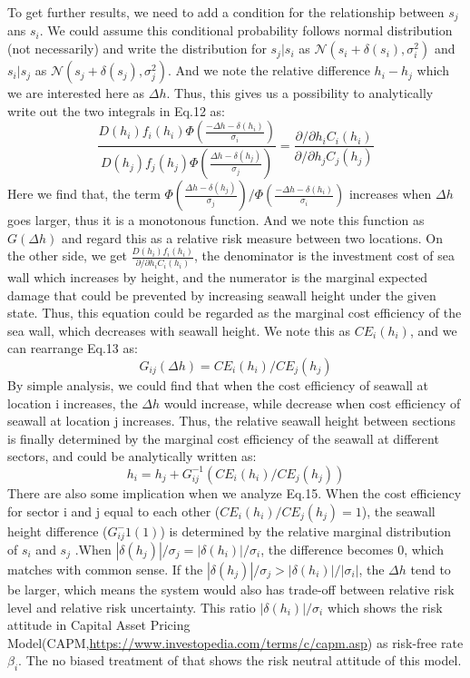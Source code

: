 \documentclass{article}
\begin{document}
To get further results, we need to add a condition for the relationship between $s_j$ ans $s_i$. We could assume this conditional probability follows normal distribution (not necessarily) and write the distribution for $s_j|s_i$ as $\mathcal{N}(s_i+\delta(s_i),\sigma_i^2)$ and $s_i|s_j$ as $\mathcal{N}(s_j+\delta(s_j),\sigma_j^2)$. And we note the relative difference $h_i-h_j$ which we are interested here as $\Delta h$. Thus, this gives us a possibility to analytically write out the two integrals in Eq.12 as:
\begin{equation}
    \frac{D(h_i)f_i(h_i)\Phi(\frac{-\Delta h-\delta(h_i)}{\sigma_i})}{D(h_j)f_j(h_j)\Phi(\frac{\Delta h-\delta(h_j)}{\sigma_j})} = \frac{{\partial}/{\partial h_i}C_i(h_i)}{{\partial}/{\partial h_j}C_j(h_j)}
\end{equation}
Here we find that, the term $\Phi(\frac{\Delta h-\delta(h_j)}{\sigma_j})/\Phi(\frac{-\Delta h-\delta(h_i)}{\sigma_i})$ increases when $\Delta h$ goes larger, thus it is a monotonous function. And we note this function as $G(\Delta h)$ and regard this as a relative risk measure between two locations.  On the other side, we get $\frac{D(h_i)f_i(h_i)}{\partial/ \partial h_i C_i(h_i)}$, the denominator is the investment cost of sea wall which increases by height, and the numerator is the marginal expected damage that could be prevented by increasing seawall height under the given state. Thus, this equation could be regarded as the marginal cost efficiency of the sea wall, which decreases with seawall height. We note this as $CE_i(h_i)$, and we can rearrange Eq.13 as:
\begin{equation}
G_{ij}(\Delta h) = CE_i(h_i)/CE_j(h_j)
\end{equation}
By simple analysis, we could find that when the cost efficiency of seawall at location i increases, the $\Delta h$ would increase, while decrease when cost efficiency of seawall at location j increases. Thus, the relative seawall height between sections is finally determined by the marginal cost efficiency of the seawall at different sectors, and could be analytically written as:
\begin{equation}
h_i = h_j  + G_{ij}^{-1}(CE_i(h_i)/CE_j(h_j))
\end{equation}
There are also some implication when we analyze Eq.15. When the cost efficiency for sector i and j equal to each other ($CE_i(h_i)/CE_j(h_j)=1$), the seawall height difference ($G_{ij}^-1(1)$) is determined by the relative marginal distribution of $s_i$ and $s_j$ .When $|\delta(h_j)|/\sigma_j = |\delta(h_i)|/\sigma_i $, the difference becomes 0, which matches with common sense. If the $|\delta(h_j)|/\sigma_j > |\delta(h_i)|/|\sigma_i|$, the $\Delta h$ tend to be larger, which means the system would also has trade-off between relative risk level and relative risk uncertainty. This ratio $|\delta(h_i)|/\sigma_i$ which shows the risk attitude in Capital Asset Pricing Model(CAPM,\url{https://www.investopedia.com/terms/c/capm.asp}) as risk-free rate $\beta_i$. The no biased treatment of that shows the risk neutral attitude of this model.
\end{document}
